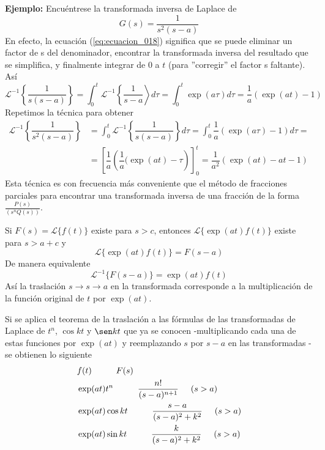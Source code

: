 \textbf{Ejemplo: } Encuéntrese la transformada inversa de Laplace de
\[ G(s) = \dfrac{1}{s^{2} (s - a)} \]
En efecto, la ecuación (\ref{eq:ecuacion_018}) significa que se puede eliminar un factor de s del denominador,
encontrar la transformada inversa del resultado que se simplifica, y finalmente
integrar de $0$ a $t$ (para ''corregir'' el factor s faltante). Así
\[ \mathscr{L}^{-1} \left\lbrace  \dfrac{1}{s (s-a)} \right\rbrace = \int_{0}^{t} \mathscr{L}^{-1} \left\lbrace \dfrac{1}{s-a} \right\rangle d \tau  = \int_{0}^{t} \exp(a \tau) d \tau  = \dfrac{1}{a} (\exp(at) - 1) \]
Repetimos la técnica para obtener
\[ \begin{split}
\mathscr{L}^{-1} \left\lbrace  \dfrac{1}{s^{2} (s-a)} \right\rbrace &= \int_{0}^{t} \mathscr{L}^{-1} \left\lbrace \dfrac{1}{s(s-a)} \right\rbrace d \tau  = \int_{0}^{t} \dfrac{1}{a} (\exp(a \tau) - 1) d \tau  = \\  
&= \left[ \dfrac{1}{a} \left( \dfrac{1}{a} (\exp(at) - \tau \right) \right]_{0}^{t} = \dfrac{1}{a^{2}} ( \exp(at) - at - 1)
\end{split} \]
Esta técnica es con frecuencia más conveniente que el método de fracciones parciales para encontrar una transformada inversa de una fracción de la forma $\frac{P(s)}{(s^{n}Q(s))}$.
\begin{teo}
Si $F(s) = \mathscr{L} \{ f(t) \}$ existe para $s > c$, entonces  $\mathscr{L} \{\exp(at) f(t) \}$ existe para $s > a + c$ y
\[ \mathscr{L} \{ \exp(at) f(t) \} = F(s-a) \]
De manera equivalente
\[ \mathscr{L}^{-1} \{ F(s-a) \} = \exp(at) f(t) \]
Así la traslación $s \to s \to a$ en la transformada corresponde a la multiplicación de la función original de $t$ por $\exp(at)$.
\end{teo}
Si se aplica el teorema de la traslación a las fórmulas de las transformadas de Laplace de $t^{n}$, $\cos kt$ y $\sen kt$ que ya se conocen  -multiplicando cada una de estas funciones por $\exp(at)$ y reemplazando $s$ por $s - a$ en las transformadas - se obtienen lo siguiente
\begin{eqnarray}
&{} f(t) \hspace{1cm} F(s)  \nonumber \\
&{} \exp(at) t^{n} \hspace{1cm} \dfrac{n!}{(s-a)^{n+1}} \hspace{0.5cm} (s > a)  \label{eq:ecuacion_106 } \\
&{} \exp(at) \cos kt \hspace{1cm} \dfrac{s-a}{(s-a)^{2}+ k^{2}} \hspace{0.5cm} (s > a)  \label{eq:ecuacion_107 }\\
&{} \exp(at) \sin kt \hspace{1cm} \dfrac{k}{(s-a)^{2} + k^{2}} \hspace{0.5cm} (s > a)  \label{eq:ecuacion_108 }
\end{eqnarray}
